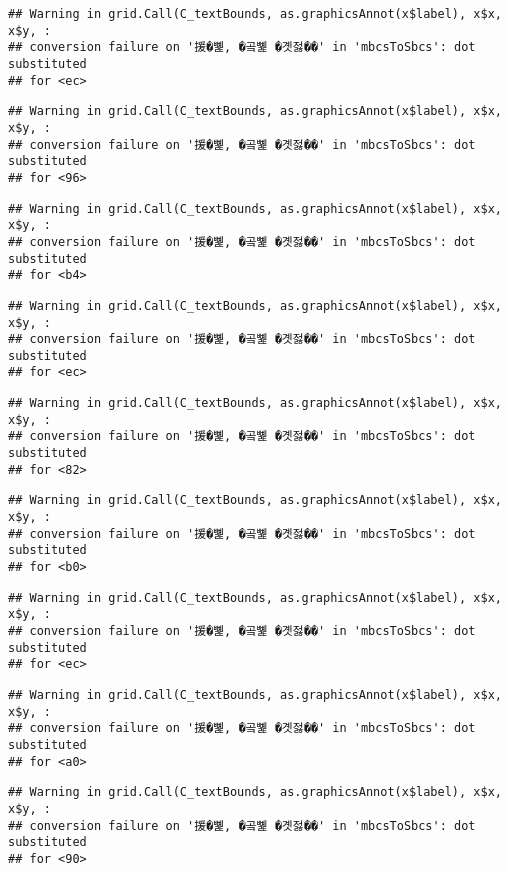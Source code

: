 \documentclass[
]{article}
\begin{document}
\begin{verbatim}
## Warning in grid.Call(C_textBounds, as.graphicsAnnot(x$label), x$x, x$y, :
## conversion failure on '援�뼱, �곸뼱 �곗젏��' in 'mbcsToSbcs': dot substituted
## for <ec>
\end{verbatim}

\begin{verbatim}
## Warning in grid.Call(C_textBounds, as.graphicsAnnot(x$label), x$x, x$y, :
## conversion failure on '援�뼱, �곸뼱 �곗젏��' in 'mbcsToSbcs': dot substituted
## for <96>
\end{verbatim}

\begin{verbatim}
## Warning in grid.Call(C_textBounds, as.graphicsAnnot(x$label), x$x, x$y, :
## conversion failure on '援�뼱, �곸뼱 �곗젏��' in 'mbcsToSbcs': dot substituted
## for <b4>
\end{verbatim}

\begin{verbatim}
## Warning in grid.Call(C_textBounds, as.graphicsAnnot(x$label), x$x, x$y, :
## conversion failure on '援�뼱, �곸뼱 �곗젏��' in 'mbcsToSbcs': dot substituted
## for <ec>
\end{verbatim}

\begin{verbatim}
## Warning in grid.Call(C_textBounds, as.graphicsAnnot(x$label), x$x, x$y, :
## conversion failure on '援�뼱, �곸뼱 �곗젏��' in 'mbcsToSbcs': dot substituted
## for <82>
\end{verbatim}

\begin{verbatim}
## Warning in grid.Call(C_textBounds, as.graphicsAnnot(x$label), x$x, x$y, :
## conversion failure on '援�뼱, �곸뼱 �곗젏��' in 'mbcsToSbcs': dot substituted
## for <b0>
\end{verbatim}

\begin{verbatim}
## Warning in grid.Call(C_textBounds, as.graphicsAnnot(x$label), x$x, x$y, :
## conversion failure on '援�뼱, �곸뼱 �곗젏��' in 'mbcsToSbcs': dot substituted
## for <ec>
\end{verbatim}

\begin{verbatim}
## Warning in grid.Call(C_textBounds, as.graphicsAnnot(x$label), x$x, x$y, :
## conversion failure on '援�뼱, �곸뼱 �곗젏��' in 'mbcsToSbcs': dot substituted
## for <a0>
\end{verbatim}

\begin{verbatim}
## Warning in grid.Call(C_textBounds, as.graphicsAnnot(x$label), x$x, x$y, :
## conversion failure on '援�뼱, �곸뼱 �곗젏��' in 'mbcsToSbcs': dot substituted
## for <90>
\end{verbatim}
\end{document}
